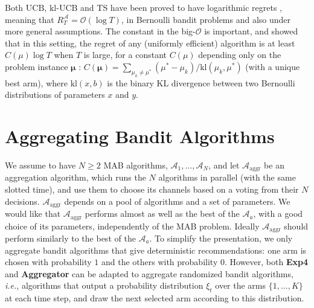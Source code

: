\documentclass[conference]{IEEEtran}
\theoremstyle{plain}  %
\newcommand{\ie}{\emph{i.e.}}
\newcommand{\UCB}[0]{$\mathrm{UCB}$}
\newcommand{\kl}[0]{\ensuremath{\mathrm{kl}}}
\newcommand{\klUCB}[0]{$\mathrm{kl}$-$\mathrm{UCB}$}
\newcommand{\Aggr}[0]{\textbf{Aggregator}}
\newcommand{\ExpQ}[0]{\textbf{Exp4}}
\newcommand{\Alg}[0]{\mathcal{A}}
\begin{document}
Both \UCB, \klUCB{} and TS have been proved to have logarithmic regrets \cite{Aueral02,AgrawalGoyal11,Kaufmann12Thompson}, meaning that $R_T^{\Alg} = \mathcal{O}(\log{T})$, in Bernoulli bandit problems and also under more general assumptions.
The constant in the big-$\mathcal{O}$ is important, and \cite{LaiRobbins85} showed that in this setting, the regret of any (uniformly efficient) algorithm is at least $C(\mu) \log{T}$ when $T$ is large, for a constant $C(\mu)$ depending only on the problem instance $\boldsymbol{\mu}$ : $ C(\boldsymbol{\mu}) = \sum_{\mu_k \neq \mu^*} (\mu^* - \mu_k) / \kl(\mu_k, \mu^*)$ (with a unique best arm),
where $\kl(x, b)$ is the binary KL divergence between two Bernoulli distributions of parameters $x$ and $y$.



\section{Aggregating Bandit Algorithms}\label{sec:aggregation}

We assume to have $N \geq 2$ MAB algorithms, $\Alg_1, \dots, \Alg_N$,
and let $\Alg_{\mathrm{aggr}}$ be an aggregation algorithm,
which runs the $N$ algorithms in parallel (with the same slotted time), and use them to choose its channels based on a voting from their $N$ decisions.
%
$\Alg_{\mathrm{aggr}}$ depends on a pool of algorithms and a set of parameters.
We would like that $\Alg_{\mathrm{aggr}}$
performs almost as well as the best of the $\Alg_a$, with a good choice of its parameters, independently of the MAB problem.
Ideally $\Alg_{\mathrm{aggr}}$ should perform similarly to the best of the $\Alg_a$.
%
To simplify the presentation, we only aggregate bandit algorithms that give deterministic recommendations:
one arm is chosen with probability $1$ and the others with probability $0$.
However, both \ExpQ{} and \Aggr{} can be adapted to aggregate randomized bandit algorithms, \ie, algorithms that output a probability distribution $\xi_t$ over the arms $\{1,\dots,K\}$ at each time step, and draw the next selected arm according to this distribution.
\end{document}
